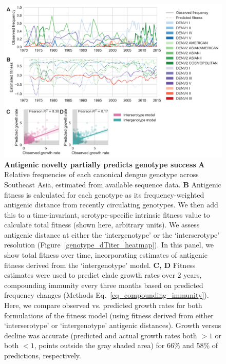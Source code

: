 \documentclass[11pt,oneside,letterpaper]{article}
\begin{document}
\begin{figure}[ht]
  \begin{centering}
\includegraphics[width=\linewidth]{../figures/png/genotype-fitness.png}
    \caption{\textbf{Antigenic novelty partially predicts genotype success }
    \textbf{A} Relative frequencies of each canonical dengue genotype across Southeast Asia, estimated from available sequence data.
    \textbf{B} Antigenic fitness is calculated for each genotype as its frequency-weighted antigenic distance from recently circulating genotypes.
    We then add this to a time-invariant, serotype-specific intrinsic fitness value to calculate total fitness (shown here, arbitrary units).
    We assess antigenic distance at either the `intergenotype' or the `interserotype' resolution (Figure~\ref{genotype_dTiter_heatmap}).
    In this panel, we show total fitness over time, incorporating estimates of antigenic fitness derived from the `intergenotype' model.
    \textbf{C, D}  Fitness estimates were used to predict clade growth rates over 2 years, compounding immunity every three months based on predicted frequency changes (Methods Eq.~\ref{eq_compounding_immunity}).
    Here, we compare observed vs. predicted growth rates for both formulations of the fitness model (using fitness derived from either `interserotype' or `intergenotype' antigenic distances).
    Growth versus decline was accurate (predicted and actual growth rates both $> 1$ or both $< 1$, points outside the gray shaded area) for 66\% and 58\% of predictions, respectively.
}
     \label{genotype_fitness}
   \end{centering}
\end{figure}
\end{document}
